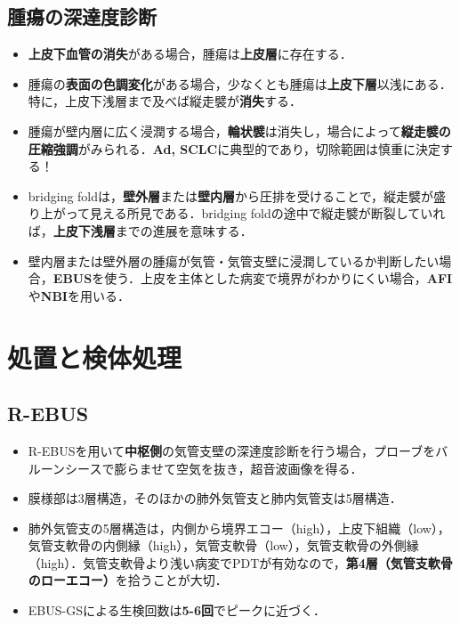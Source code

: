 \subsection{腫瘍の深達度診断}
\begin{itemize}


\item \textbf{上皮下血管の消失}がある場合，腫瘍は\textbf{上皮層}に存在する．
\item 腫瘍の\textbf{表面の色調変化}がある場合，少なくとも腫瘍は\textbf{上皮下層}以浅にある．特に，上皮下浅層まで及べば縦走襞が\textbf{消失}する．
\item 腫瘍が壁内層に広く浸潤する場合，\textbf{輪状襞}は消失し，場合によって\textbf{縦走襞の圧縮強調}がみられる．\textbf{Ad, SCLC}に典型的であり，切除範囲は慎重に決定する！

\item bridging foldは，\textbf{壁外層}または\textbf{壁内層}から圧排を受けることで，縦走襞が盛り上がって見える所見である．bridging foldの途中で縦走襞が断裂していれば，\textbf{上皮下浅層}までの進展を意味する．

\item 壁内層または壁外層の腫瘍が気管・気管支壁に浸潤しているか判断したい場合，\textbf{EBUS}を使う．上皮を主体とした病変で境界がわかりにくい場合，\textbf{AFI}や\textbf{NBI}を用いる．


\end{itemize}
\newpage
\section{処置と検体処理}
\subsection{R-EBUS}

\begin{itemize}
\item R-EBUSを用いて\textbf{中枢側}の気管支壁の深達度診断を行う場合，プローブをバルーンシースで膨らませて空気を抜き，超音波画像を得る．
\item 膜様部は3層構造，そのほかの肺外気管支と肺内気管支は5層構造．
\item 肺外気管支の5層構造は，内側から境界エコー（high），上皮下組織（low），気管支軟骨の内側縁（high），気管支軟骨（low），気管支軟骨の外側縁（high）．気管支軟骨より浅い病変でPDTが有効なので，\textbf{第4層（気管支軟骨のローエコー）}を拾うことが大切．
\item EBUS-GSによる生検回数は\textbf{5-6回}でピークに近づく．
\end{itemize}

